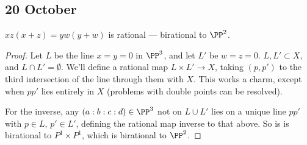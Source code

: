 \documentclass[11pt]{article}
\begin{document}
\begin{Oct20}
\section*{20 October}
\begin{exmp*}
$xz(x+z)=yw(y+w)$ is rational --- birational to $\PP^2$.
\end{exmp*}
\begin{proof}
Let $L$ be the line $x=y=0$ in $\PP^3$, and let $L'$ be $w=z=0$. $L,L'\subset X$, and $L\cap L'=\emptyset$. We'll define a rational map $L\times L'\to X$, taking $(p,p')$ to the third intersection of the line through them with $X$. This works a charm, except when $pp'$ lies entirely in $X$ (problems with double points can be resolved).

For the inverse, any $(a:b:c:d)\in\PP^3$ not on $L\cup L'$ lies on a unique line $pp'$ with $p\in L$, $p'\in L'$, defining the rational map inverse to that above. So is is birational to $P^1\times P^1$, which is birational to $\PP^2$.
\end{proof}

\end{Oct20}
\end{document}
